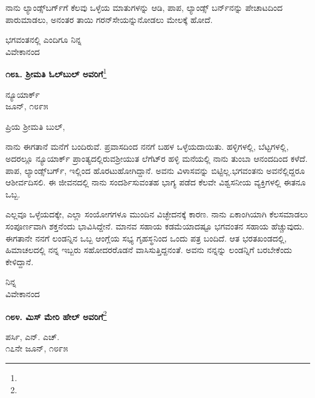 ನಾನು ಲ್ಯಾಂಡ್ಸ್‌ಬರ್ಗ್‌ಗೆ ಕೆಲವು ಒಳ್ಳೆಯ ಮಾತುಗಳನ್ನು ಆಡಿ, ಪಾಪ, ಲ್ಯಾಂಡ್ಸ್ ಬರ್ನ್‌ನನ್ನು ಪೇಚಾಟದಿಂದ ಪಾರುಮಾಡಲು, ಅನಂತರ ತಾಯಿ ಗರನ್‌ಸೇಯನ್ನು\break ನೋಡಲು ಮೇಲಕ್ಕೆ ಹೋದೆ.

\vspace{-0.5cm}

{\flushright
ಭಗವಂತನಲ್ಲಿ ಎಂದಿಗೂ ನಿನ್ನ\\ವಿವೇಕಾನಂದ\par}

\begin{center}
\textbf{೧೮೩. ಶ‍್ರೀಮತಿ ಓಲ್‌ಬುಲ್‌ ಅವರಿಗೆ}\footnote{}
\end{center}

\begin{flushright}
ನ್ಯೂಯಾರ್ಕ್\\ಜೂನ್, ೧೮೯೫
\end{flushright}

\noindent
ಪ್ರಿಯ ಶ‍್ರೀಮತಿ ಬುಲ್,

ನಾನು ಈಗತಾನೆ ಮನೆಗೆ ಬಂದಿರುವೆ. ಪ್ರವಾಸದಿಂದ ನನಗೆ ಬಹಳ ಒಳ್ಳೆಯ\break ದಾಯಿತು. ಹಳ್ಳಿಗಳಲ್ಲಿ, ಬೆಟ್ಟಗಳಲ್ಲಿ, ಅದರಲ್ಲೂ ನ್ಯೂಯಾರ್ಕ್ ಪ್ರಾಂತ್ಯದಲ್ಲಿರುವ\break ಶ‍್ರೀಯುತ ಲೆಗೆಟ್‌ರ ಹಳ್ಳಿ ಮನೆಯಲ್ಲಿ ನಾನು ತುಂಬಾ ಆನಂದದಿಂದ ಕಳೆದೆ. ಪಾಪ, ಲ್ಯಾಂಡ್ಸ್‌ಬರ್ಗ್, ಇಲ್ಲಿಂದ ಹೊರಟುಹೋಗಿದ್ದಾನೆ. ಅವನು ವಿಳಾಸವನ್ನು ಬಿಟ್ಟಿಲ್ಲ.\break ಭಗವಂತನು ಅವನೆಲ್ಲಿದ್ದರೂ ಆಶೀರ್ವದಿಸಲಿ. ಈ ಜೀವನದಲ್ಲಿ ನಾನು ಸಂದರ್ಶಿಸುವಂತಹ ಭಾಗ್ಯ ಪಡೆದ ಕೆಲವೇ ವಿಶ್ವಸನೀಯ ವ್ಯಕ್ತಿಗಳಲ್ಲಿ ಈತನೂ ಒಬ್ಬ.

\vspace{0.1cm}

ಎಲ್ಲವೂ ಒಳ್ಳೆಯದಕ್ಕೇ, ಎಲ್ಲಾ ಸಂಯೋಗಗಳೂ ಮುಂದಿನ ವಿಚ್ಛೇದನಕ್ಕೆ ಕಾರಣ. ನಾನು ಏಕಾಂಗಿಯಾಗಿ ಕೆಲಸಮಾಡಲು ಸಂಪೂರ್ಣವಾಗಿ ಶಕ್ತನೆಂದು ಭಾವಿಸಿದ್ದೇನೆ. ಮಾನವ ಸಹಾಯ ಕಡಮೆಯಾದಷ್ಟೂ ಭಗವಂತನ ಸಹಾಯ ಹೆಚ್ಚುವುದು. ಈಗತಾನೇ ನನಗೆ ಲಂಡನ್ನಿನ ಒಬ್ಬ ಆಂಗ್ಲೆಯ ಸಭ್ಯ ಗೃಹಸ್ಥನಿಂದ ಒಂದು ಪತ್ರ ಬಂದಿದೆ. ಆತ ಭರತಖಂಡದಲ್ಲಿ, ಹಿಮಾಚಲದಲ್ಲಿ ನನ್ನ ಇಬ್ಬರು ಸಹೋದರರೊಡನೆ ವಾಸಿಸುತ್ತಿದ್ದನಂತೆ. ಅವನು ನನ್ನನ್ನು ಲಂಡನ್ನಿಗೆ ಬರಬೇಕೆಂದು ಕೇಳಿದ್ದಾನೆ.

{\flushright
ನಿನ್ನ\\ವಿವೇಕಾನಂದ\par}

\begin{center}
\textbf{೧೮೪. ಮಿಸ್ ಮೇರಿ ಹೇಲ್ ಅವರಿಗೆ}\footnote{}
\end{center}

\vspace{-0.7cm}

\begin{flushright}
ಪರ್ಸಿ, ಎನ್. ಎಚ್.\\೧೭ನೇ ಜೂನ್, ೧೮೯೫
\end{flushright}

